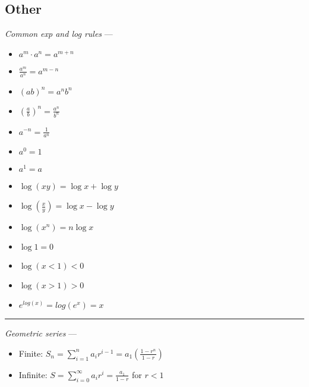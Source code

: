 \subsection*{Other}
\emph{Common exp and log rules} ---
\begin{multicols}{2}
\begin{itemize}
    \item $a^m \cdot a^n = a^{m+n}$
    \item $\frac{a^m}{a^n} = a^{m-n}$
    \item $(ab)^n = a^n b^n$
    \item $\left(\frac{a}{b}\right)^n = \frac{a^n}{b^n}$
    \item $a^{-n} = \frac{1}{a^n}$
    \item $a^0 = 1$
    \item $a^1 = a$
    \item $\log(xy) = \log x + \log y$
    \item $\log\left(\frac{x}{y}\right) = \log x - \log y$
    \item $\log(x^n) = n \log x$
    \item $\log 1 = 0$
    \item $\log (x<1) < 0$
    \item $\log (x>1) > 0$
    \item $e^{log(x)} = log(e^x) = x$
\end{itemize}
\end{multicols}

{\color{lightgray}\hrule height 0.001mm}

\emph{Geometric series} --- 
\begin{itemize}
    \item Finite: $S_n = \sum_{i=1}^n a_i r^{i-1} = a_1 (\frac{1-r^n}{1-r})$
    \item Infinite: $S = \sum_{i=0}^\infty a_i r^i = \frac{a_1}{1-r}$ for $r < 1$
\end{itemize}